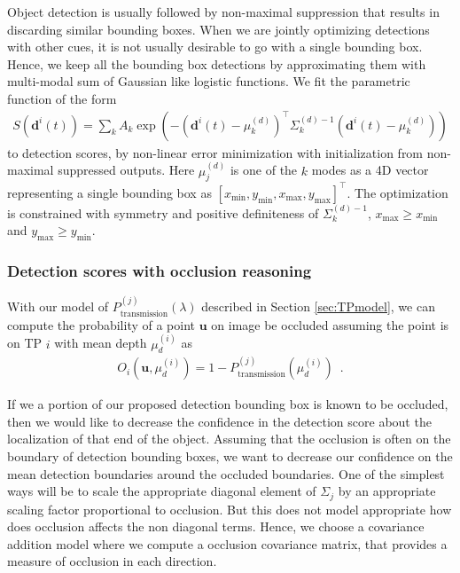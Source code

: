 \documentclass[10pt,twocolumn,letterpaper]{article}
\newcommand{\bb}[1]{\mathbf{d}^{#1}(t)}
\newcommand{\minx}{x_{\text{min}}}
\newcommand{\miny}{y_{\text{min}}}
\newcommand{\maxx}{x_{\text{max}}}
\newcommand{\maxy}{y_{\text{max}}}
\newcommand{\Ptrans}{P^{(j)}_{\text{transmission}}(\lambda)}
\newcommand{\Ptransmud}{P^{(j)}_{\text{transmission}}(\mu^{(i)}_d)}
\begin{document}
Object detection is usually followed by non-maximal suppression that results in
discarding similar bounding boxes. When we are jointly optimizing detections
with other cues, it is not usually desirable to go with a single bounding box.
Hence, we keep all the bounding box detections by approximating them with
multi-modal sum of Gaussian like logistic functions. We fit the parametric function of the form 
%
\begin{align}
  S(\bb{i}) = \sum_k A_k \exp(-(\bb{i}-\mu^{(d)}_k)^\top \Sigma^{(d)-1}_k
  (\bb{i}-\mu^{(d)}_k))
\end{align}
%
to detection scores, by non-linear error minimization with initialization from
non-maximal suppressed outputs. Here $\mu^{(d)}_j$ is one of the $k$ modes as a
4D vector representing a single bounding box as $[\minx, \miny, \maxx,
\maxy]^\top$. The optimization is constrained with symmetry and positive
definiteness of $\Sigma^{(d)-1}_k$, $\maxx \ge \minx$ and $\maxy \ge \miny$.

\subsubsection{Detection scores with occlusion reasoning} 
With our model of $\Ptrans$ described in Section \ref{sec:TPmodel}, we can
compute the probability of a point $\mathbf{u}$ on image be occluded assuming
the point is on TP $i$ with mean depth $\mu^{(i)}_d$ as
\begin{align}
  O_{i}(\mathbf{u}, \mu^{(i)}_d) = 1 - \Ptransmud \enspace .
\end{align}

If we a portion of our proposed detection bounding box is known to be occluded,
then we would like to decrease the confidence in the detection score about the
localization of that end of the object. Assuming that the occlusion is often on
the boundary of detection bounding boxes, we want to decrease our confidence on
the mean detection boundaries around the occluded boundaries. 
One of the simplest ways will be to scale the appropriate diagonal element of
$\Sigma_j$ by an appropriate scaling factor proportional to occlusion. But this
does not model appropriate how does occlusion affects the non diagonal terms.
Hence, we choose a covariance addition model where we compute a occlusion
covariance matrix, that provides a measure of occlusion in each direction.
\end{document}
